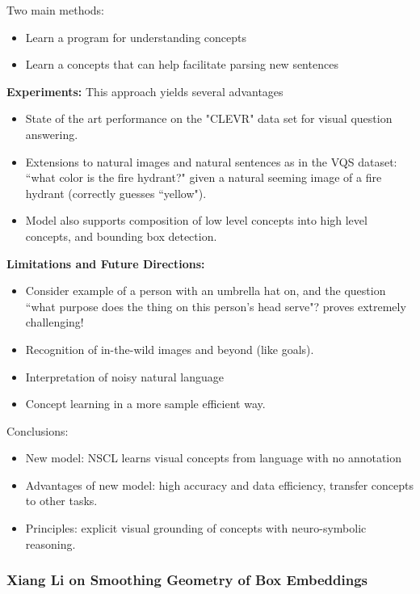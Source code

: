 Two main methods:
\begin{itemize}
    \item Learn a program for understanding concepts
    \item Learn a concepts that can help facilitate parsing new sentences
\end{itemize}

{\bf Experiments:} This approach yields several advantages
\begin{itemize}
    \item State of the art performance on the "CLEVR" data set for visual question answering.
    \item Extensions to natural images and natural sentences as in the VQS dataset: ``what color is the fire hydrant?" given a natural seeming image of a fire hydrant (correctly guesses ``yellow").
    \item Model also supports composition of low level concepts into high level concepts, and bounding box detection.
\end{itemize}

{\bf Limitations and Future Directions:}
\begin{itemize}
    \item Consider example of a person with an umbrella hat on, and the question ``what purpose does the thing on this person's head serve"? proves extremely challenging!
    \item Recognition of in-the-wild images and beyond (like goals).
    \item Interpretation of noisy natural language
    \item Concept learning in a more sample efficient way.
\end{itemize}

Conclusions:
\begin{itemize}
    \item New model: NSCL learns visual concepts from language with no annotation
    \item Advantages of new model:  high accuracy and data efficiency, transfer concepts to other tasks.
    \item Principles: explicit visual grounding of concepts with neuro-symbolic reasoning.
\end{itemize}

\subsubsection{Xiang Li on Smoothing Geometry of Box Embeddings~\cite{li2018smoothing}}

